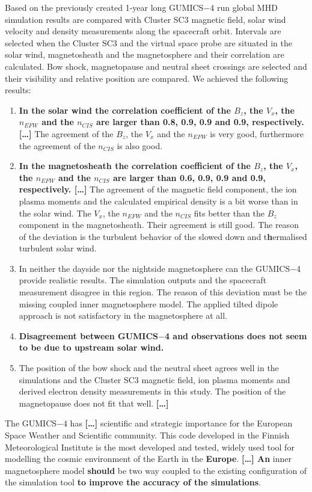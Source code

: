 \documentclass[linenumbers,draft]{agujournal}
\begin{document}
Based on the previously created 1-year long GUMICS$-$4 run global MHD simulation results are compared with Cluster SC3 magnetic field, solar wind velocity and density measurements along the spacecraft orbit. Intervals are selected when the Cluster SC3 and the virtual space probe are situated in the solar wind, magnetosheath and the magnetosphere and their correlation are calculated. Bow shock, magnetopause and neutral sheet crossings are selected and their visibility and relative position are compared. We achieved the following results:
\begin{enumerate}
\item \textbf{In the solar wind the correlation coefficient of the $B_{z}$, the $V_{x}$, the $n_{EFW}$ and the $n_{CIS}$ are larger than 0.8, 0.9, 0.9 and 0.9, respectively. \textbf{[\dots]}} The agreement of the $B_{z}$, the $V_{x}$ and the $n_{EFW}$ is very good, furthermore the agreement of the $n_{CIS}$ is also good. 
\item \textbf{In the magnetosheath the correlation coefficient of the $B_{z}$, the $V_{x}$, the $n_{EFW}$ and the $n_{CIS}$ are larger than 0.6, 0.9, 0.9 and 0.9, respectively. \textbf{[\dots]}} The agreement of the magnetic field component, the ion plasma moments and the calculated empirical density is a bit worse than in the solar wind. The $V_{x}$, the $n_{EFW}$ and the $n_{CIS}$ fits better than the $B_{z}$ component in the magnetosheath. Their agreement is still good. The reason of the deviation is the turbulent behavior of the slowed down and t\textbf{h}ermalised turbulent solar wind.
\item In neither the dayside nor the nightside magnetosphere can the GUMICS$-$4 provide realistic results. The simulation outputs and the spacecraft measurement disagree in this region. The reason of this deviation must be the missing coupled inner magnetosphere model. The applied tilted dipole approach is not satisfactory in the magnetosphere at all. 
\item \textbf{Disagreement between GUMICS$-$4 and observations does not seem to be due to upstream solar wind.}
\item The position of the bow shock and the neutral sheet agrees well in the simulations and the Cluster SC3 magnetic field, ion plasma moments and derived electron density measurements in this study. The position of the magnetopause does not fit that well. \textbf{[\dots]}
\end{enumerate}
The GUMICS$-$4 has \textbf{[\dots]} scientific and strategic importance for the European Space Weather and Scientific community. This code developed in the Finnish Meteorological Institute is the most developed and tested, widely used tool for modelling the cosmic environment of the Earth in the \textbf{Europe}. \textbf{[\dots] An} inner magnetosphere model \textbf{should} be two way coupled to the existing configuration of the simulation tool \textbf{to improve the accuracy of the simulations}.
\end{document}
